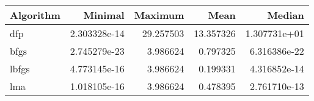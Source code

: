 \begin{tabular}{lrrrr}
\toprule
Algorithm &      Minimal &   Maximum &      Mean &       Median \\
\midrule
      dfp & 2.303328e-14 & 29.257503 & 13.357326 & 1.307731e+01 \\
     bfgs & 2.745279e-23 &  3.986624 &  0.797325 & 6.316386e-22 \\
    lbfgs & 4.773145e-16 &  3.986624 &  0.199331 & 4.316852e-14 \\
      lma & 1.018105e-16 &  3.986624 &  0.478395 & 2.761710e-13 \\
\bottomrule
\end{tabular}
